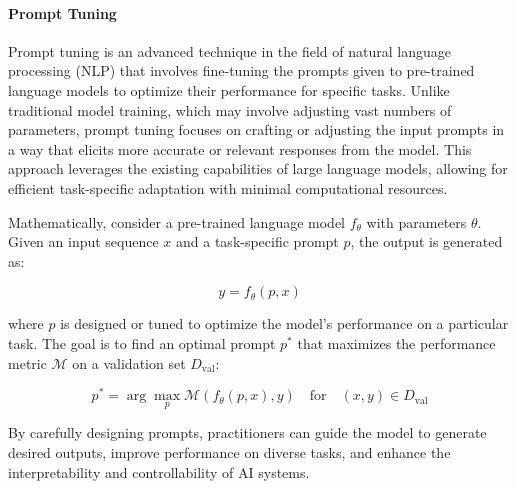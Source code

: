 \paragraph{Prompt Tuning}
Prompt tuning is an advanced technique in the field of natural language processing (NLP) that involves fine-tuning the prompts given to pre-trained language models to optimize their performance for specific tasks. Unlike traditional model training, which may involve adjusting vast numbers of parameters, prompt tuning focuses on crafting or adjusting the input prompts in a way that elicits more accurate or relevant responses from the model. This approach leverages the existing capabilities of large language models, allowing for efficient task-specific adaptation with minimal computational resources.

Mathematically, consider a pre-trained language model \( f_\theta \) with parameters \( \theta \). Given an input sequence \( x \) and a task-specific prompt \( p \), the output is generated as:

\[ y = f_\theta(p, x) \]

where \( p \) is designed or tuned to optimize the model's performance on a particular task. The goal is to find an optimal prompt \( p^* \) that maximizes the performance metric \( \mathcal{M} \) on a validation set \( D_{\text{val}} \):

\[ p^* = \arg\max_p \mathcal{M}(f_\theta(p, x), y) \quad \text{for} \quad (x, y) \in D_{\text{val}} \]

By carefully designing prompts, practitioners can guide the model to generate desired outputs, improve performance on diverse tasks, and enhance the interpretability and controllability of AI systems.

